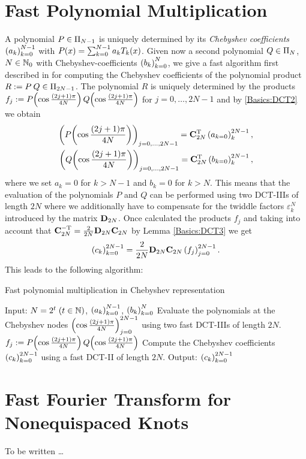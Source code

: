 \section{Fast Polynomial Multiplication}
\label{Basics:FastPolynomialMultiplication}
A polynomial $P \in \Pi_{N-1}$ is uniquely determined by its \emph{Chebyshev coefficients} 
$\left(a_{k}\right)_{k = 0}^{N-1}$ with $P{\hspace{-0.4ex}}\left(x\right) = \sum_{k=0}^{N-1} a_{k} T_{k}{\hspace{-0.4ex}}\left(x\right)$. Given 
now a second polynomial $Q \in \Pi_{N}$, $N \in \mathbb{N}_{0}$ with Chebyshev-coefficients 
$\left(b_{k}\right)_{k = 0}^N$, we give a fast algorithm first described in \cite{postta97} for computing the 
Chebyshev coefficients of the polynomial product $R := P \: Q \in \Pi_{2N-1}$. The polynomial $R$ is uniquely determined 
by the products $f_{j} := P{\hspace{-0.4ex}}\left(\cos \frac{(2j+1)\pi}{4N}\right) Q{\hspace{-0.4ex}}\left(\cos \frac{(2j+1)\pi}{4N}\right)$ for $j = 0,\ldots,2N-1$ and 
by \eqref{Basics:DCT2} we obtain
\begin{eqnarray*}
  \left(P{\hspace{-0.4ex}}\left(\cos \frac{(2j+1)\pi}{4N}\right)\right)_{j=0,\ldots,2N-1} = \mathbf{C}_{2N}^{\text{\rm{T}}} \left(a_{k=0}\right)_{k}^{2N-1},\\
  \left(Q{\hspace{-0.4ex}}\left(\cos \frac{(2j+1)\pi}{4N}\right)\right)_{j=0,\ldots,2N-1} = \mathbf{C}_{2N}^{\text{\rm{T}}} \left(b_{k=0}\right)_{k}^{2N-1},
\end{eqnarray*}
where we set $a_{k} = 0$ for $k > N-1$ and $b_{k} = 0$ for $k > N$. This means that the evaluation 
of the polynomials $P$ and $Q$ can be performed using two DCT-IIIs of length $2N$ where we additionally have to 
compensate for the twiddle factors $\varepsilon_{k}^N$ introduced by the matrix $\mathbf{D}_{2N}$.
Once calculated the products $f_{j}$ and taking into account that $\mathbf{C}_{2N}^{-\text{\rm{T}}} = \frac{2}{2N} \mathbf{D}_{2N} \mathbf{C}_{2N}$ 
by Lemma \ref{Basics:DCT3} we get
$$ \left(c_{k}\right)_{k=0}^{2N-1} = \frac{2}{2N} \mathbf{D}_{2N} \mathbf{C}_{2N} \left(f_{j}\right)_{j = 0}^{2N-1}.$$
This leads to the following algorithm:

\begin{algorithm}[ht]
  \caption{Fast polynomial multiplication in Chebyshev representation}
  \label{Basics:Algorithm:FastPolynomialMultiplication}    
  \begin{algorithmic}
    \STATE  Input:  $N = 2^t\; (t \in \mathbb{N})$, $\left(a_{k}\right)_{k = 0}^{N-1}$, $\left(b_{k}\right)_{k = 0}^{N}$
    \STATE
    \STATE Evaluate the polynomials at the Chebyshev nodes $\left(\cos \frac{(2j+1)\pi}{4N}\right)_{j = 0}^{2N-1}$
      using two fast DCT-IIIs of length $2N$.
    \STATE 
      \STATE $f_{j} := P{\hspace{-0.4ex}}\left(\cos \frac{(2j+1)\pi}{4N}\right) Q{\hspace{-0.4ex}}\left(\cos \frac{(2j+1)\pi}{4N}\right)$
    \ENDFOR
    \STATE
    \STATE Compute the Chebyshev coefficients $\left(c_{k}\right)_{k=0}^{2N-1}$ using a fast DCT-II of length $2N$.
    \STATE
    \STATE Output: $\left(c_{k}\right)_{k=0}^{2N-1}$
\end{algorithmic}
\end{algorithm}

\section{Fast Fourier Transform for Nonequispaced Knots}
\label{Basics:NFFT}

To be written \dots